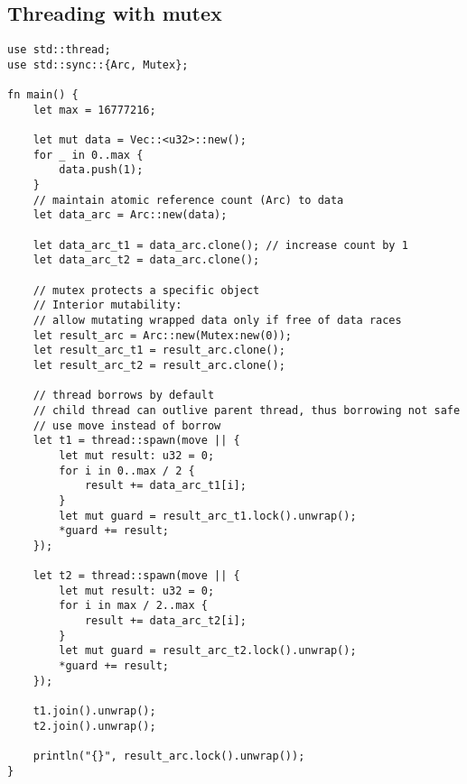 \documentclass[twocolumn,landscape,10pt]{article}
\theoremstyle{definition}
\begin{document}
\subsection{Threading with mutex}
\begin{lstlisting}[Rust]
use std::thread;
use std::sync::{Arc, Mutex};

fn main() {
    let max = 16777216;
    
    let mut data = Vec::<u32>::new();
    for _ in 0..max {
        data.push(1);
    }
    // maintain atomic reference count (Arc) to data
    let data_arc = Arc::new(data);

    let data_arc_t1 = data_arc.clone(); // increase count by 1
    let data_arc_t2 = data_arc.clone();

    // mutex protects a specific object
    // Interior mutability: 
    // allow mutating wrapped data only if free of data races
    let result_arc = Arc::new(Mutex:new(0));
    let result_arc_t1 = result_arc.clone();
    let result_arc_t2 = result_arc.clone();

    // thread borrows by default
    // child thread can outlive parent thread, thus borrowing not safe
    // use move instead of borrow
    let t1 = thread::spawn(move || {
        let mut result: u32 = 0;
        for i in 0..max / 2 {
            result += data_arc_t1[i];
        }
        let mut guard = result_arc_t1.lock().unwrap();
        *guard += result;
    });

    let t2 = thread::spawn(move || {
        let mut result: u32 = 0;
        for i in max / 2..max {
            result += data_arc_t2[i];
        }
        let mut guard = result_arc_t2.lock().unwrap();
        *guard += result;
    });

    t1.join().unwrap();
    t2.join().unwrap();

    println("{}", result_arc.lock().unwrap());
}
\end{lstlisting} 
\end{document}
